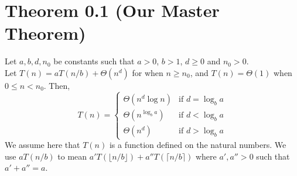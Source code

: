 \documentclass{article}
\begin{document}
\section*{Theorem 0.1 (Our Master Theorem)}
Let $a, b, d, n_0$ be constants such that $a > 0$, $b > 1$, $d \ge 0$ and $n_0 > 0$. \\
Let $T(n) = aT(n/b) + \Theta(n^d)$ for when $n \ge n_0$, and $T(n) = \Theta(1)$ when $0 \le n < n_0$. Then,
\[
T(n) = \begin{cases}
    \Theta(n^d \log n) & \text{if } d = \log_b a \\
    \Theta(n^{\log_b a}) & \text{if } d < \log_b a \\
    \Theta(n^d) & \text{if } d > \log_b a
\end{cases}
\]
We assume here that $T(n)$ is a function defined on the natural numbers. We use $aT(n/b)$ to mean $a'T(\lfloor n/b \rfloor) + a''T(\lceil n/b \rceil)$ where $a', a'' > 0$ such that $a' + a'' = a$.
\end{document}
